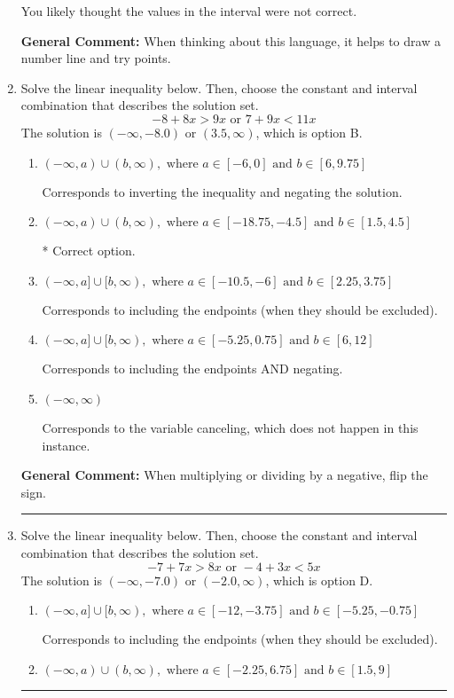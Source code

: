 \documentclass{extbook}[14pt]
\newcommand{\litem}[1]{\item #1

\rule{\textwidth}{0.4pt}}
\begin{document}
\begin{enumerate}
{\begin{enumerate}[label=\Alph*.]
You likely thought the values in the interval were not correct.
\end{enumerate}

\textbf{General Comment:} When thinking about this language, it helps to draw a number line and try points.
}
\litem{
Solve the linear inequality below. Then, choose the constant and interval combination that describes the solution set.
\[ -8 + 8 x > 9 x \text{ or } 7 + 9 x < 11 x \]The solution is \( (-\infty, -8.0) \text{ or } (3.5, \infty) \), which is option B.\begin{enumerate}[label=\Alph*.]
\item \( (-\infty, a) \cup (b, \infty), \text{ where } a \in [-6, 0] \text{ and } b \in [6, 9.75] \)

Corresponds to inverting the inequality and negating the solution.
\item \( (-\infty, a) \cup (b, \infty), \text{ where } a \in [-18.75, -4.5] \text{ and } b \in [1.5, 4.5] \)

 * Correct option.
\item \( (-\infty, a] \cup [b, \infty), \text{ where } a \in [-10.5, -6] \text{ and } b \in [2.25, 3.75] \)

Corresponds to including the endpoints (when they should be excluded).
\item \( (-\infty, a] \cup [b, \infty), \text{ where } a \in [-5.25, 0.75] \text{ and } b \in [6, 12] \)

Corresponds to including the endpoints AND negating.
\item \( (-\infty, \infty) \)

Corresponds to the variable canceling, which does not happen in this instance.
\end{enumerate}

\textbf{General Comment:} When multiplying or dividing by a negative, flip the sign.
}
\litem{
Solve the linear inequality below. Then, choose the constant and interval combination that describes the solution set.
\[ -7 + 7 x > 8 x \text{ or } -4 + 3 x < 5 x \]The solution is \( (-\infty, -7.0) \text{ or } (-2.0, \infty) \), which is option D.\begin{enumerate}[label=\Alph*.]
\item \( (-\infty, a] \cup [b, \infty), \text{ where } a \in [-12, -3.75] \text{ and } b \in [-5.25, -0.75] \)

Corresponds to including the endpoints (when they should be excluded).
\item \( (-\infty, a) \cup (b, \infty), \text{ where } a \in [-2.25, 6.75] \text{ and } b \in [1.5, 9] \)


\end{enumerate}}
\end{enumerate}
\end{document}
